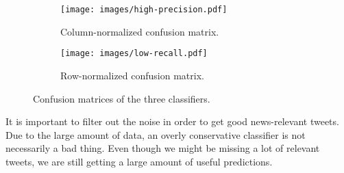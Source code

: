 \documentclass{llncs}
\begin{document}
\begin{figure}[H]
    \centering
    \begin{subfigure}[b]{0.48\textwidth}
        \texttt{[image: images/high-precision.pdf]}
        \caption{Column-normalized confusion matrix.}
        \label{fig:column-confusion-matrix}
    \end{subfigure}
    \begin{subfigure}[b]{0.48\textwidth}
        \texttt{[image: images/low-recall.pdf]}
        \caption{Row-normalized confusion matrix.}
        \label{fig:row-confusion-matrix}
    \end{subfigure}
    \caption{Confusion matrices of the three classifiers.}
    \label{fig:confusion-matrix}
 \end{figure}
 
It is important to filter out the noise in order to get good news-relevant tweets. Due to the large amount of data, an overly conservative classifier is not necessarily a bad thing. Even though we might be missing a lot of relevant tweets, we are still getting a large amount of useful predictions.



\end{document}
